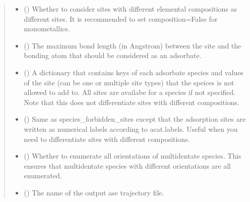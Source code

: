 \documentclass[letterpaper,10pt,english]{sphinxmanual}
\begin{document}
\begin{fulllineitems}
\begin{quote}
\begin{description}
\begin{itemize}
\item {} 
 (\sphinxstyleliteralemphasis{\sphinxupquote{, }}) \textendash{} Whether to consider sites with different elemental
compositions as different sites. It is recommended to
set composition=False for monometallics.

\item {} 
 (\sphinxstyleliteralemphasis{\sphinxupquote{, }}) \textendash{} The maximum bond length (in Angstrom) between the site and the
bonding atom  that should be considered as an adsorbate.

\item {} 
 (\sphinxstyleliteralemphasis{\sphinxupquote{, }}) \textendash{} A dictionary that contains keys of each adsorbate species and
values of the site (can be one or multiple site types) that the
speices is not allowed to add to. All sites are availabe for a
species if not specified. Note that this does not differentiate
sites with different compositions.

\item {} 
 (\sphinxstyleliteralemphasis{\sphinxupquote{, }}) \textendash{} Same as species\_forbidden\_sites except that the adsorption sites
are written as numerical labels according to acat.labels. Useful
when you need to differentiate sites with different compositions.

\item {} 
 (\sphinxstyleliteralemphasis{\sphinxupquote{, }}) \textendash{} Whether to enumerate all orientations of multidentate species.
This ensures that multidentate species with different orientations
are all enumerated.

\item {} 
 (\sphinxstyleliteralemphasis{\sphinxupquote{, }}) \textendash{} The name of the output ase trajectory file.


\end{itemize}
\end{description}
\end{quote}
\end{fulllineitems}
\end{document}

